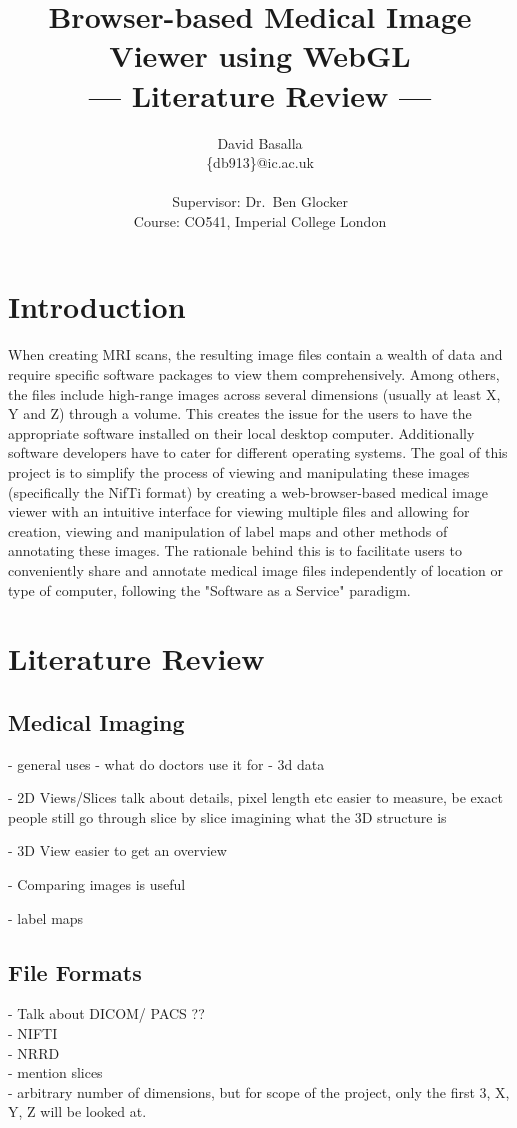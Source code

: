 \documentclass[a4paper,11pt,titlepage]{article}
\title{Browser-based Medical Image Viewer using WebGL \\\Large{--- Literature Review ---}}
\author{David Basalla\\
       \{db913\}@ic.ac.uk\\ \\
       \small{Supervisor: Dr.\ Ben Glocker}\\
       \small{Course: CO541, Imperial College London}
}
\begin{document}
\maketitle

\section{Introduction}
When creating MRI scans, the resulting image files contain a wealth of data and require specific software packages to view them comprehensively. Among others, the files include high-range images across several dimensions (usually at least X, Y and Z) through a volume. This creates the issue for the users to have the appropriate software installed on their local desktop computer. Additionally software developers have to cater for different operating systems. The goal of this project is to simplify the process of viewing and manipulating these images (specifically the NifTi format) by creating a web-browser-based medical image viewer with an intuitive interface for viewing multiple files and allowing for creation, viewing and manipulation of label maps and other methods of annotating these images. The rationale behind this is to facilitate users to conveniently share and annotate medical image files independently of location or type of computer, following the "Software as a Service" paradigm.

\section{Literature Review}

\subsection{Medical Imaging}

- general uses
	- what do doctors use it for
	- 3d data

- 2D Views/Slices
	talk about details, pixel length etc
	easier to measure, be exact
	people still go through slice by slice
	imagining what the 3D structure is

- 3D View
	easier to get an overview
	
- Comparing images is useful	
	
- label maps
	
	
\subsection{File Formats}
- Talk about DICOM/ PACS ?? \\
- NIFTI\\
- NRRD\\
- mention slices\\
- arbitrary number of dimensions, but for scope of the project, only the first 3, X, Y, Z will be looked at.
\end{document}
